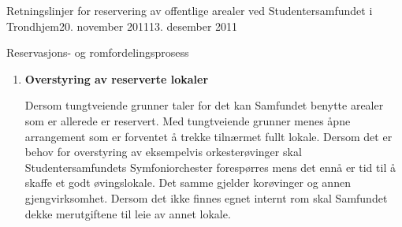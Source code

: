 \documentclass[fsbok.tex]{subfiles}
\begin{document}
\begin{instruks}{Retningslinjer for reservering av offentlige arealer
    ved Studentersamfundet i Trondhjem}{20. november 2011}{13. desember 2011}
\begin{instruksledd}{Reservasjons- og romfordelingsprosess}
\begin{enumerate}
                I etterkant av semesterets rombookingsmøte kan Kontrollkontoret
                fortløpende reservere rom
                til interesserte.
                \begin{enumerate}
                    \item  Ledige lokaler tildeles i henhold til normer for
                        prioritering.
                    \item Utlån/-leie skal vanligvis ikke gå på bekostning av interne
                        romreservasjoner. Punkt 5.3 beskriver
                        retningslinjer ved overstyring av reserverte lokaler.
                    \item Romutlån til eksterne arrangementer som ikke står i
                        semesterprogrammet fastsettes endelig to uker før
                        arrangementet.
                    \item Romutleie som ikke står i semesterprogrammet kan fastsettes
                        to måneder før arrangementet dersom særlige
                        grunner taler for det.
                    \item Endringer og informasjon om ledige arealer skal til enhver
                        tid ligge oppdatert på robokop.samfundet.no.
                \end{enumerate}

            \item \textbf{Overstyring av reserverte lokaler}

                Dersom tungtveiende grunner taler for det kan Samfundet benytte
                arealer som er allerede er reservert. Med
                tungtveiende grunner menes åpne arrangement som er forventet å trekke
                tilnærmet fullt lokale. Dersom det er behov
                for overstyring av eksempelvis orkesterøvinger skal
                Studentersamfundets Symfoniorchester forespørres mens det ennå
                er tid til å skaffe et godt øvingslokale. Det samme gjelder korøvinger
                og annen gjengvirksomhet. Dersom det ikke
                finnes egnet internt rom skal Samfundet dekke merutgiftene til leie av
                annet lokale.
        \end{enumerate}

    \end{instruksledd}


\end{instruks}
\end{document}
